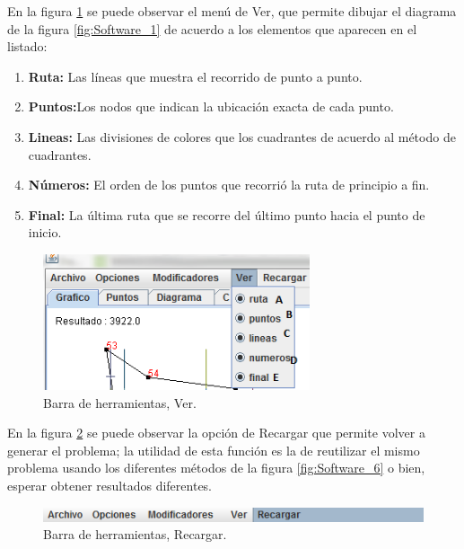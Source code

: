 \hspace*{1cm}En la figura \ref {fig:Software_7} se puede observar el menú de Ver, que permite dibujar el diagrama de la figura \ref {fig:Software_1} de acuerdo a los elementos que aparecen en el listado:

\begin{enumerate}[label=\Alph*.-]
\item \textbf{Ruta:} Las líneas que muestra el recorrido de punto a punto.
\item \textbf{Puntos:}Los nodos que indican la ubicación exacta de cada punto.
\item \textbf{Lineas:} Las divisiones de colores que los cuadrantes de acuerdo al método de cuadrantes.
\item \textbf{Números:} El orden de los puntos que recorrió la ruta de principio a fin.
\item \textbf{Final:} La última ruta que se recorre del último punto hacia el punto de inicio.
\end{enumerate}

     \begin{figure}[hbtp]
        \centering
            \includegraphics[width=0.7\textwidth]{Software/Imagenes/Software_7.png}
            \caption{Barra de herramientas, Ver.}
            \label{fig:Software_7}
    \end{figure}
    
\hspace*{1cm}En la figura \ref {fig:Software_8} se puede observar la opción de Recargar que permite volver a generar el problema; la utilidad de esta función es la de reutilizar el mismo problema usando los diferentes métodos de la figura \ref {fig:Software_6} o bien, esperar obtener resultados diferentes.\\

     \begin{figure}[hbtp]
        \centering
            \includegraphics{Software/Imagenes/Software_8.png}
            \caption{Barra de herramientas, Recargar.}
            \label{fig:Software_8}
    \end{figure}
    
